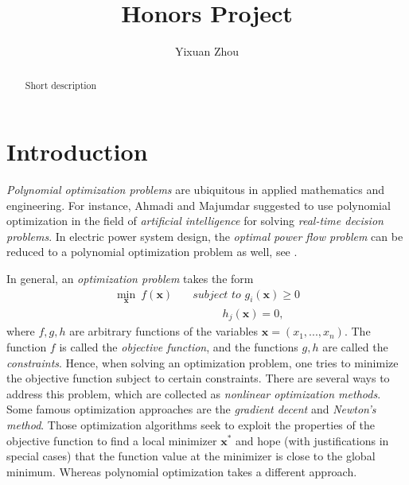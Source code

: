 \documentclass[12pt]{amsart}
\title{Honors Project}
\author{Yixuan Zhou} %
\numberwithin{equation}{section}
\theoremstyle{definition}
\numberwithin{thm}{section}
\begin{document}
 

\begin{abstract}
Short description
\end{abstract}

\maketitle


\section{Introduction} 

\emph{Polynomial optimization problems} are ubiquitous in applied mathematics and engineering. 
For instance, Ahmadi and Majumdar \cite{ahmadi2015applications} suggested to use
polynomial optimization in the field of \emph{artificial intelligence} for solving
\emph{real-time decision problems}. 
In electric power system design, the \emph{optimal power flow problem}
can be reduced to a polynomial optimization problem as well, see \cite{josz:tel-01478431}.

In general, an \emph{optimization problem} takes the form 
\begin{equation}
     \label{eq:optimization problem}
     \begin{split}
          \min_{\mathbf{x}} \ f(\mathbf{x}) & \quad \textit{subject to } g_i(\mathbf{x}) \geq 0 \\
          & \quad \quad \quad \text{ \ \ \ \ \ \  } h_j(\mathbf{x}) = 0, 
     \end{split}
 \end{equation}
where $f, g, h$ are arbitrary functions of the variables $\mathbf{x} = (x_1, ..., x_n)$. 
The function $f$ is called the \emph{objective function}, and the functions $g, h$ are called the \emph{constraints}.
Hence, when solving an optimization problem, one tries to minimize the objective function subject to certain constraints.
There are several ways to address this problem, which are collected as \emph{nonlinear optimization methods}. 
Some famous optimization approaches are the \emph{gradient decent} and \emph{Newton's method}. 
Those optimization algorithms seek to exploit the properties of the objective function to find a
local minimizer $\mathbf{x}^*$ and hope (with justifications in special cases) that the function value at the minimizer is close
to the global minimum. Whereas polynomial optimization takes a different approach.
\end{document}
